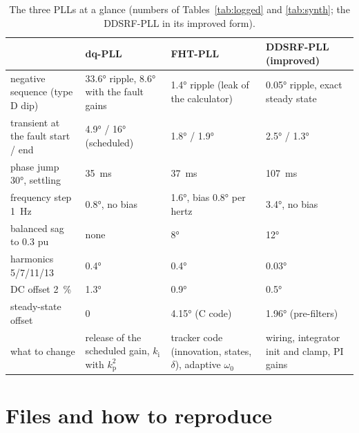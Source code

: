\documentclass[11pt,a4paper]{scrartcl}
\newcommand{\ped}[1]{_{\mathrm{#1}}}
\begin{document}
\begin{onehalfspace}
\begin{table}[H]
	\centering
	\caption{The three PLLs at a glance (numbers of Tables~\ref{tab:logged} and \ref{tab:synth}; the DDSRF-PLL in its improved form).}
	\label{tab:summary}
	\begin{tabularx}{\textwidth}{@{} l X X X @{}}
		\toprule
		& dq-PLL & FHT-PLL & DDSRF-PLL (improved) \\
		\midrule
		negative sequence (type D dip) & \ang{33.6} ripple, \ang{8.6} with the fault gains & \ang{1.4} ripple (leak of the calculator) & \ang{0.05} ripple, exact steady state \\
		transient at the fault start / end & \ang{4.9} / \ang{16} (scheduled) & \ang{1.8} / \ang{1.9} & \ang{2.5} / \ang{1.3} \\
		phase jump \ang{30}, settling & \SI{35}{\milli\second} & \SI{37}{\milli\second} & \SI{107}{\milli\second} \\
		frequency step \SI{1}{\hertz} & \ang{0.8}, no bias & \ang{1.6}, bias \ang{0.8} per hertz & \ang{3.4}, no bias \\
		balanced sag to \num{0.3} pu & none & \ang{8} & \ang{12} \\
		harmonics 5/7/11/13 & \ang{0.4} & \ang{0.4} & \ang{0.03} \\
		DC offset \num{2}~\% & \ang{1.3} & \ang{0.9} & \ang{0.5} \\
		steady-state offset & 0 & \ang{4.15} (C code) & \ang{1.96} (pre-filters) \\
		what to change & release of the scheduled gain, $k\ped{i}$ with $k\ped{p}^2$ & tracker code (innovation, states, $\delta$), adaptive $\omega_0$ & wiring, integrator init and clamp, PI gains \\
		\bottomrule
	\end{tabularx}
\end{table}

\section{Files and how to reproduce}
\label{sec:files}


\end{onehalfspace}
\end{document}
